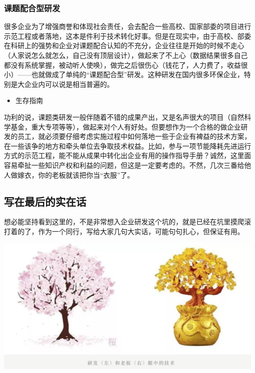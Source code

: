 \documentclass[]{book}
\providecommand{\tightlist}{%
  \setlength{\itemsep}{0pt}\setlength{\parskip}{0pt}}
\begin{document}
\hypertarget{ux8bfeux9898ux914dux5408ux578bux7814ux53d1}{%
\subsubsection{课题配合型研发}\label{ux8bfeux9898ux914dux5408ux578bux7814ux53d1}}

很多企业为了增强商誉和体现社会责任，会去配合一些高校、国家部委的项目进行示范工程或者落地，这本是件利于技术转化好事。但是在现实中，由于高校、部委在科研上的强势和企业对课题配合认知的不充分，企业往往是开始的时候不走心（人家说怎么就怎么，自己没有顶层设计），做起来了不上心（数据结果很多自己都没有系统掌握，被动听人使唤），做完之后很伤心（钱花了，人力费了，收益很小）------也就做成了单纯的``课题配合型''研发。这种研发在国内很多环保企业，特别是大企业内可以说是相当普遍的。

\begin{itemize}
\tightlist
\item
  生存指南
\end{itemize}

功利的说，课题类研发一般伴随着不错的成果产出，又是名声很大的项目（自然科学基金，重大专项等等），做起来对个人有好处。但要想作为一个合格的做企业研发的员工，就必须要仔细考虑实施过程中如何落地一些于企业有裨益的技术方案，在一些该争的地方和牵头单位去争取技术权益。比如，参与一项节能降耗先进运行方式的示范工程，能不能从成果中转化出企业有用的操作指导手册？诚然，这里面容易牵扯一些知识产权和利益的问题，但这是一定要考虑的。不然，几次三番给他人做嫁衣，你的老板就该把你当``衣服''了。

\hypertarget{ux5199ux5728ux6700ux540eux7684ux5b9eux5728ux8bdd}{%
\subsection{写在最后的实在话}\label{ux5199ux5728ux6700ux540eux7684ux5b9eux5728ux8bdd}}

想必能坚持看到这里的，不是非常想入企业研发这个坑的，就是已经在坑里摸爬滚打着的了，作为一个同行，写给大家几句大实话，可能句句扎心，但保证有用。

\includegraphics[width=6.67in]{images/qiye6}
\end{document}
